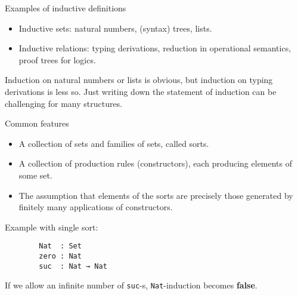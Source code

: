 \documentclass[dvipsnames]{beamer}
\begin{document}
\begin{frame}{Examples of inductive definitions}

  \begin{itemize}
  \item Inductive sets: natural numbers, (syntax) trees, lists.
  \item Inductive relations: typing derivations, reduction in
    operational semantics, proof trees for logics.
  \end{itemize}

\pause
\vspace{1em}
\vspace{1em}
Induction on natural numbers or lists is obvious, but induction on typing derivations
is less so. Just writing down the statement of induction can be challenging for
many structures.

\end{frame}


\begin{frame}[fragile]{Common features}


  \begin{itemize}
  \item A collection of sets and families of sets, called sorts.
  \item A collection of production rules (constructors), each producing elements of some set.
  \item The assumption that elements of the sorts are precisely those generated by finitely many
        applications of constructors.
  \end{itemize}

\vspace{1em}
Example with single sort:

\begin{verbatim}
        Nat  : Set
        zero : Nat
        suc  : Nat → Nat
\end{verbatim}
\vspace{1em}
If we allow an infinite number of \texttt{suc}-s, \texttt{Nat}-induction becomes \textbf{false}.

\end{frame}
\end{document}
